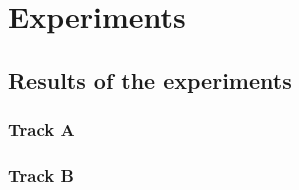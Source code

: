 \chapter{Experiments}

\lipsum[10]

\section{Results of the experiments}

\lipsum[10]

\subsection{Track A}

\lipsum[10]

\subsection{Track B}

\lipsum[10]
